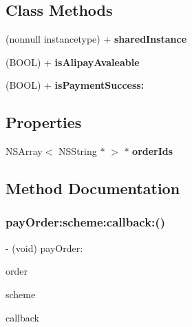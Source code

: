 \subsection*{Class Methods}
\begin{DoxyCompactItemize}
\item 
\mbox{\label{interface_alibc_alipay_bridge_a08dcf2a6e3040506d5cd70da14d6a3a7}} 
(nonnull instancetype) + {\bfseries shared\+Instance}
\item 
\mbox{\label{interface_alibc_alipay_bridge_a14c57728ed4cfc3269cac9b065433908}} 
(B\+O\+OL) + {\bfseries is\+Alipay\+Avaleable}
\item 
\mbox{\label{interface_alibc_alipay_bridge_aa130925e46f72cc79066f0e7088a45c8}} 
(B\+O\+OL) + {\bfseries is\+Payment\+Success\+:}
\end{DoxyCompactItemize}
\subsection*{Properties}
\begin{DoxyCompactItemize}
\item 
\mbox{\label{interface_alibc_alipay_bridge_aaec84ded0036a906fe873d997d954301}} 
N\+S\+Array$<$ N\+S\+String $\ast$ $>$ $\ast$ {\bfseries order\+Ids}
\end{DoxyCompactItemize}


\subsection{Method Documentation}
\mbox{\label{interface_alibc_alipay_bridge_a91043c94a597d5e0d8f4e1268a21abd2}} 
\subsubsection{\texorpdfstring{pay\+Order\+:scheme\+:callback\+:()}{payOrder:scheme:callback:()}}
{\footnotesize\ttfamily -\/ (void) pay\+Order\+: \begin{DoxyParamCaption}\item[{(nonnull N\+S\+String $\ast$)}]{order }\item[{scheme:(nonnull N\+S\+String $\ast$)}]{scheme }\item[{callback:(nullable void($^\wedge$)(N\+S\+Dictionary $\ast$\+\_\+\+\_\+nullable result))}]{callback }\end{DoxyParamCaption}}


